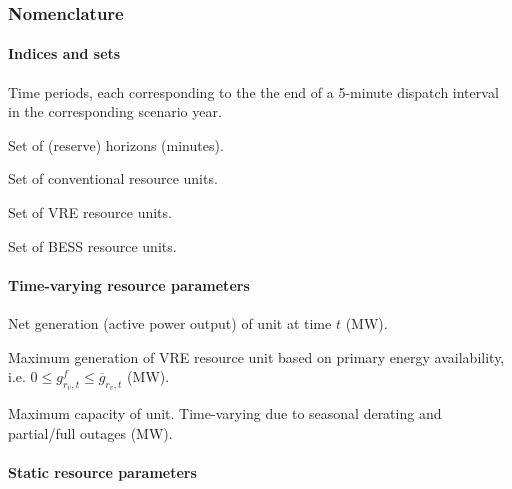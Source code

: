 \documentclass[12pt,a4paper,]{report}
\begin{document}
\hypertarget{sec:reserves-nomenclature}{%
\subsubsection{Nomenclature}\label{sec:reserves-nomenclature}}

\hypertarget{indices-and-sets}{%
\paragraph{Indices and sets}\label{indices-and-sets}}

\begin{description}[leftmargin=8em,style=nextline]
  \item[$t \in \mathcal{T}$] Time periods, each corresponding to the the end of a 5-minute dispatch interval in the corresponding scenario year.
  \item[$h \in \mathcal{H}$] Set of (reserve) horizons (minutes).
  \item[$r_c \in \mathcal{R}_c$]  Set of conventional  resource units.
  \item[$r_v \in \mathcal{R}_v$]  Set of VRE  resource units.
  \item[$r_b \in \mathcal{R}_b$]  Set of BESS resource units.
\end{description}

\hypertarget{time-varying-resource-parameters}{%
\paragraph{Time-varying resource
parameters}\label{time-varying-resource-parameters}}

\begin{description}[leftmargin=8em,style=nextline]
  \item[$g_{r_c/r_v/r_b,t}$] Net generation (active power output) of unit at time $t$ (MW).
  \item[$g^f_{r_v,t}$] Maximum generation of VRE resource unit based on primary energy availability, i.e.  $0 \leq g^f_{r_v,t} \leq \overline{g}_{r_v,t}$ (MW).
  \item[$\overline{g}_{r_c/r_v/r_b,t}$] Maximum capacity of unit. Time-varying due to seasonal derating and partial/full outages (MW).
\end{description}

\hypertarget{static-resource-parameters}{%
\paragraph{Static resource
parameters}\label{static-resource-parameters}}
\end{document}
